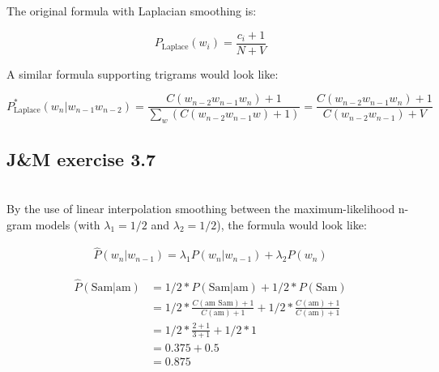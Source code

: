 \documentclass[a4paper, 11pt]{article}
\begin{document}
The original formula with Laplacian smoothing is:

\begin{equation}
	P_{\text{Laplace}}(w_i) = \frac{c_i + 1}{N + V}
\end{equation}

A similar formula supporting trigrams would look like:

\begin{equation}
	P^*_{\text{Laplace}}(w_n|w_{n-1} w_{n-2}) = \frac{C(w_{n-2}w_{n-1}w_{n})+1}{\sum_{w} (C(w_{n-2}w_{n-1}w) + 1)} = \frac{C(w_{n-2}w_{n-1}w_n) + 1}{C(w_{n-2}w_{n-1}) + V}
\end{equation}

\subsection{J\&M exercise 3.7}

\noindent{}\\

By the use of linear interpolation smoothing between the maximum-likelihood n-gram models (with $\lambda_{1} = 1/2$ and $\lambda_{2} = 1/2$), the formula would look like:

\begin{equation}
	\begin{split}
		\hat{P}(w_n|w_{n-1}) = \lambda_1 P(w_n|w_{n-1}) + \lambda_2 P(w_{n})
	\end{split}
\end{equation}

\begin{equation}
	\begin{split}
		\hat{P}(\text{Sam}|\text{am}) & = 1/2 * P(\text{Sam}|\text{am}) + 1/2 * P(\text{Sam}) \\
		 & = 1/2 * \frac{C(\text{am Sam}) + 1}{C(\text{am}) + 1} + 1/2 * \frac{C(\text{am}) + 1}{C(\text{am}) + 1} \\ & = 1/2 * \frac{2 + 1}{3 + 1} + 1/2 * 1
		 \\ & = 0.375 + 0.5 \\ & = 0.875
	\end{split}
\end{equation}
\end{document}
